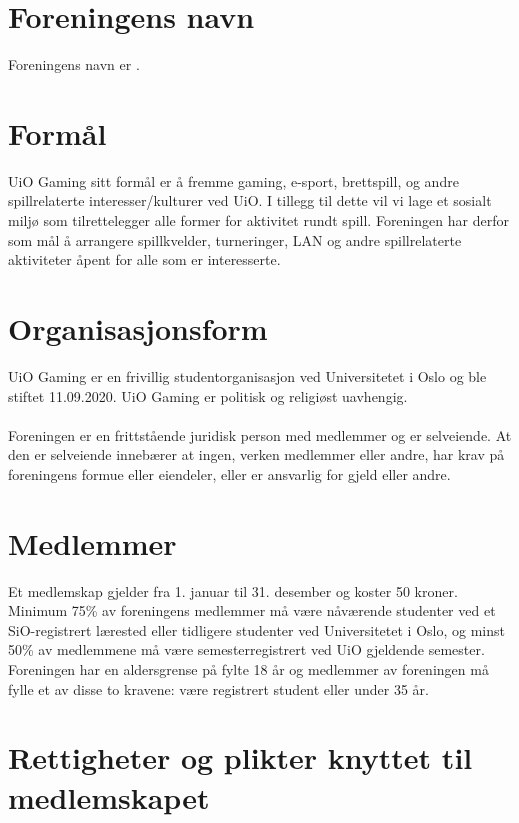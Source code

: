 \documentclass[12pt,a4paper,norsk]{article}
\begin{document}
\section{Foreningens navn}
Foreningens navn er .


\section{Formål}

UiO Gaming sitt formål er å fremme gaming, e-sport, brettspill, og andre spillrelaterte
interesser/kulturer ved UiO. I tillegg til dette vil vi lage et sosialt miljø som tilrettelegger alle
former for aktivitet rundt spill. Foreningen har derfor som mål å arrangere spillkvelder,
turneringer, LAN og andre spillrelaterte aktiviteter åpent for alle som er interesserte.



\section{Organisasjonsform}

UiO Gaming er en frivillig studentorganisasjon ved Universitetet i Oslo og ble stiftet
11.09.2020. UiO Gaming er politisk og religiøst uavhengig.
\\
\\
Foreningen er en frittstående juridisk person med medlemmer og er selveiende. At den er
selveiende innebærer at ingen, verken medlemmer eller andre, har krav på foreningens formue
eller eiendeler, eller er ansvarlig for gjeld eller andre.



\section{Medlemmer}

Et medlemskap gjelder fra 1. januar til 31. desember og koster 50 kroner. Minimum 75\% av 
foreningens medlemmer må være nåværende studenter ved et SiO-registrert lærested eller 
tidligere studenter ved Universitetet i Oslo, og minst 50\% av medlemmene må være semesterregistrert 
ved UiO gjeldende semester. Foreningen har en aldersgrense på fylte 18 år og medlemmer av foreningen må 
fylle et av disse to kravene: være registrert student eller under 35 år.



\section{Rettigheter og plikter knyttet til medlemskapet}
\end{document}
